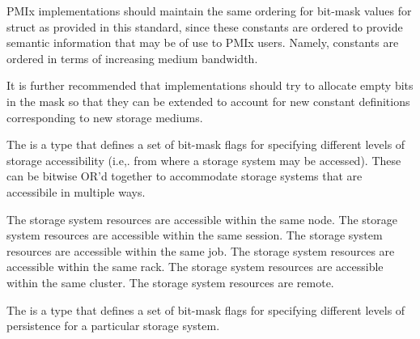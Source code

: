 \adviceimplstart
PMIx implementations should maintain the same ordering for bit-mask values for  struct as provided in this standard, since these constants are ordered to provide semantic information that may be of use to PMIx users. Namely,  constants are ordered in terms of increasing medium bandwidth.

It is further recommended that implementations should try to allocate empty bits in the mask so that they can be extended to account for new constant definitions corresponding to new storage mediums.
\adviceimplend

\provisionalMarker{}

The  is a  type that defines a set of bit-mask flags for specifying different levels of storage accessibility (i.e,. from where a storage system may be accessed). These can be bitwise OR'd together to accommodate storage systems that are accessibile in multiple ways.

\begin{constantdesc}
%
The storage system resources are accessible within the same node.
%
The storage system resources are accessible within the same session.
%
The storage system resources are accessible within the same job.
%
The storage system resources are accessible within the same rack.
%
The storage system resources are accessible within the same cluster.
%
The storage system resources are remote.
%
\end{constantdesc}

\provisionalMarker{}

The  is a  type that defines a set of bit-mask flags for specifying different levels of persistence for a particular storage system.


